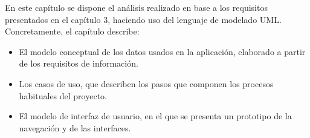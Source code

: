En este capítulo se dispone el análisis realizado en base a los requisitos presentados
en el capítulo 3, haciendo uso del lenguaje de modelado UML. Concretamente,
el capítulo describe:

\begin{itemize}
\item El modelo conceptual de los datos usados en la aplicación, elaborado a
partir de los requisitos de información.
\item Los casos de uso, que describen los pasos que componen los procesos habituales del proyecto.
\item El modelo de interfaz de usuario, en el que se presenta un prototipo de la
navegación y de las interfaces.
\end{itemize}
